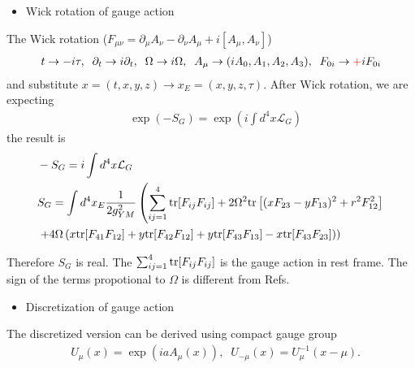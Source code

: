 \begin{itemize}
  \item Wick rotation of gauge action
\end{itemize}

The Wick rotation ($F_{\mu\nu}=\partial _{\mu}A_{\nu}-\partial _{\nu}A_{\mu}+i[A_{\mu},A_{\nu}]$)
\begin{equation}
\begin{split}
&t\to -i\tau,\;\;\partial _t \to i\partial _t,\;\;\Omega \to i\Omega ,\;\;A_{\mu}\to (iA_0,A_1,A_2,A_3),\;\;F_{0i}\to \textcolor[rgb]{1,0,0}{+}iF_{0i}\\
\end{split}
\end{equation}
and substitute $x=(t,x,y,z)\to x_E=(x,y,z,\tau)$. After Wick rotation, we are expecting
\begin{equation}
\begin{split}
&\exp(-S_G)=\exp (i\int d^4 x \mathcal{L}_G)
\end{split}
\end{equation}
the result is
\begin{equation}
\begin{split}
&-S_G=i\int d^4 x\mathcal{L}_G\\
&S_G=\int d^4 x_E \frac{1}{2g_{YM}^2}\left(\sum _{ij=1}^4 {\rm tr}[F_{ij}F_{ij}]+2\Omega^2 {\rm tr}\left[(x F_{23}-y F_{13})^2+r^2 F_{12}^2\right]\right.\\
&\left.+4\Omega\left(x {\rm tr}[F_{41}F_{12}]+y {\rm tr}[F_{42}F_{12}]+y {\rm tr}[F_{43}F_{13}]-x {\rm tr}[F_{43}F_{23}]\right)\right)
\end{split}
\end{equation}

Therefore $S_G$ is real. The $\sum _{ij=1}^4 {\rm tr}[F_{ij}F_{ij}]$ is the gauge action in rest frame. \textcolor[rgb]{1,0,0}{The sign of the terms propotional to $\Omega$ is different from Refs.}

\begin{itemize}
  \item Discretization of gauge action
\end{itemize}

The discretized version can be derived using compact gauge group
\begin{equation}
\begin{split}
&U_{\mu}(x)=\exp (i a A_{\mu}(x)),\;\;U_{-\mu}(x)=U_{\mu}^{-1}(x-\mu).
\end{split}
\end{equation}

